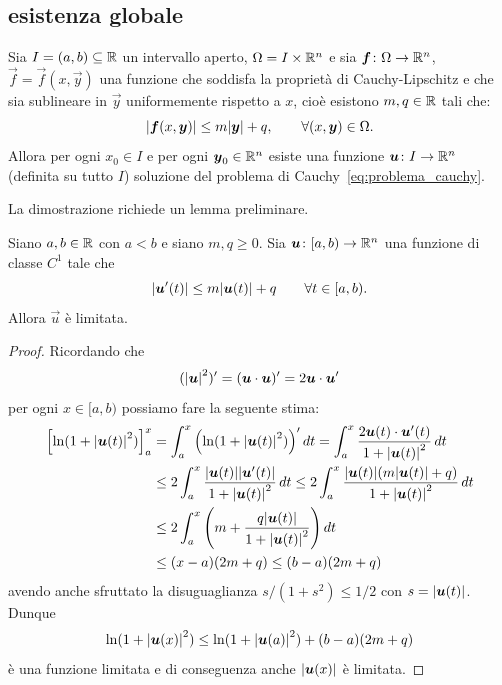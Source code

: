 \subsection{esistenza globale}

\begin{theorem}
\label{th:edo_esistenza_globale}
Sia $I = (a,b) \subseteq {\mathbb R}$ un intervallo aperto, $\Omega=I\times {\mathbb R}^n$ e sia
$\boldsymbol f\colon \Omega \to {\mathbb R}^n$, $\vec f = \vec f(x,\vec y)$ una funzione che
soddisfa la proprietà di Cauchy-Lipschitz
e che sia sublineare in $\vec y$ uniformemente rispetto a $x$, cioè
esistono $m,q\in {\mathbb R}$ tali che:
\[
  {\left|\boldsymbol f(x,\boldsymbol y)\right|} \le m{\left|\boldsymbol y\right|} + q,
  \qquad\forall (x,\boldsymbol y)\in \Omega.
\]
Allora per ogni $x_0\in I$ e per ogni $\boldsymbol y_0\in {\mathbb R}^n$ esiste una funzione
$\boldsymbol u\colon I \to {\mathbb R}^n$ (definita su tutto $I$) soluzione del problema di Cauchy~\eqref{eq:problema_cauchy}.
\end{theorem}
%
La dimostrazione richiede un lemma preliminare.
\begin{lemma}[Gronwall]
Siano $a,b\in {\mathbb R}$ con $a<b$ e siano $m,q\ge 0$.
Sia $\boldsymbol u \colon [a,b) \to {\mathbb R}^n$ una funzione di classe $C^1$
tale che
\[
  {\left|\boldsymbol u'(t)\right|} \le m {\left|\boldsymbol u(t)\right|} + q
  \qquad \forall t\in [a,b).
\]
Allora $\vec u$ è limitata.
\end{lemma}
%
\begin{proof}
Ricordando che
\[
  ({\left|\boldsymbol u\right|}^2)'
  = (\boldsymbol u\cdot \boldsymbol u)'
  = 2 \boldsymbol u \cdot \boldsymbol u'
\]
per ogni $x\in [a,b)$ possiamo fare la seguente stima:
\begin{align*}
{\left[ \ln(1+{\left|\boldsymbol u(t)\right|}^2) \right]}_{a}^{x}
&= \int_{a}^{x}
  {\left( \ln(1+{\left|\boldsymbol u(t)\right|}^2) \right)}' \, dt
= \int_{a}^{x}
\frac{2\boldsymbol u(t)\cdot \boldsymbol u'(t)}{1+{\left|\boldsymbol u(t)\right|}^2}\, dt \\
&\le 2 \int_{a}^{x} \frac{{\left|\boldsymbol u(t)\right|} {\left|\boldsymbol u'(t)\right|}}{1+{\left|\boldsymbol u(t)\right|}^2}\, dt
\le 2\int_{a}^{x} \frac{{\left|\boldsymbol u(t)\right|}{\left( m{\left|\boldsymbol u(t)\right|}+q \right)}}{1+{\left|\boldsymbol u(t)\right|}^2}\, dt\\
&\le 2\int_{a}^{x} {\left( m + \frac{q{\left|\boldsymbol u(t)\right|}}{1+{\left|\boldsymbol u(t)\right|}^2} \right)}\, dt\\
&\le (x-a)(2m + q) \le (b-a)(2m+q)
\end{align*}
avendo anche sfruttato la disuguaglianza $s/(1+s^2) \le 1/2$ con $s={\left|\boldsymbol u(t)\right|}$.
Dunque
\[
  \ln(1+{\left|\boldsymbol u(x)\right|}^2) \le \ln(1+{\left|\boldsymbol u(a)\right|}^2) + (b-a)(2m+q)
\]
è una funzione limitata e di conseguenza anche ${\left|\boldsymbol u(x)\right|}$ è limitata.
\end{proof}

